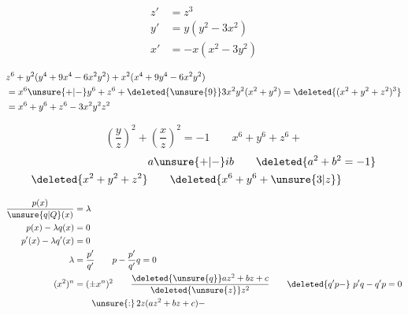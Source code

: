 \[
\begin{aligned}
z'&=z^3\\
y'&=y(y^2-3x^2)\\
x'&=-x(x^2-3y^2)
\end{aligned}
\]

\[
\begin{aligned}
&z^6+y^2(y^4+9x^4-6x^2y^2)+x^2(x^4+9y^4-6x^2y^2)\\
&=x^6\unsure{+|-}y^6+z^6+\deleted{\unsure{9}}3x^2y^2(x^2+y^2)=\deleted{(x^2+y^2+z^2)^3}\\
&=x^6+y^6+z^6-3x^2y^2z^2
\end{aligned}
\]

\[
\left(\frac yz\right)^2+\left(\frac xz\right)^2=-1
\qquad x^6+y^6+z^6+
\]
\[
\begin{aligned}
& a\unsure{+|-}ib \qquad \deleted{a^2+b^2=-1}\\
\deleted{x^2+y^2+z^2}&\qquad\deleted{x^6+y^6+\unsure{3|z}}
\end{aligned}
\]


\[
\begin{aligned}
\frac{p(x)}{\unsure{q|Q}(x)}&=\lambda\\
p(x)-\lambda q(x)&=0\\
p'(x)-\lambda q'(x)&=0\\
\lambda&=\frac{p'}{q'}\qquad p-\frac{p'}{q'}q=0\\
(x^2)^n&=(\pm x^n)^2 \qquad
\frac{\deleted{\unsure{q}}az^2+bz+c}{\deleted{\unsure{z}}z^2}
\qquad\deleted{q'p-}\ p'q-q'p=0\\
&\qquad \unsure{:}\,2z(az^2+bz+c)-
\end{aligned}
\]

